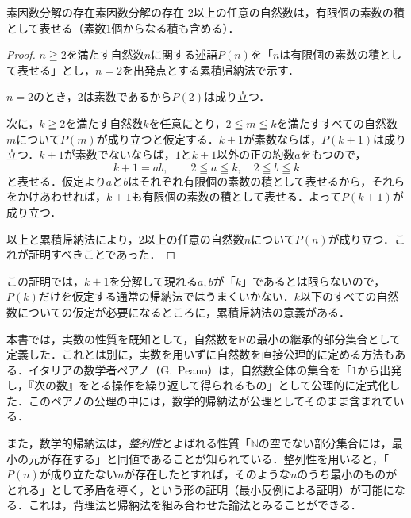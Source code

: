 \begin{prop}{素因数分解の存在}{素因数分解の存在}
  $2$以上の任意の自然数は，有限個の素数の積として表せる（素数$1$個からなる積も含める）．
\end{prop}

\begin{tleftbar}
  \begin{proof}
    $n \geqq 2$を満たす自然数$n$に関する述語$P(n)$を「$n$は有限個の素数の積として表せる」とし，$n = 2$を出発点とする累積帰納法で示す．

    $n = 2$のとき，$2$は素数であるから$P(2)$は成り立つ．

    次に，$k \geqq 2$を満たす自然数$k$を任意にとり，$2 \leqq m \leqq k$を満たすすべての自然数$m$について$P(m)$が成り立つと仮定する．$k + 1$が素数ならば，$P(k+1)$は成り立つ．$k + 1$が素数でないならば，$1$と$k + 1$以外の正の約数$a$をもつので，
    \[
      k + 1 = ab, \qquad 2 \leqq a \leqq k,\quad 2 \leqq b \leqq k
    \]
    と表せる．仮定より$a$と$b$はそれぞれ有限個の素数の積として表せるから，それらをかけあわせれば，$k + 1$も有限個の素数の積として表せる．よって$P(k+1)$が成り立つ．

    以上と累積帰納法により，$2$以上の任意の自然数$n$について$P(n)$が成り立つ．これが証明すべきことであった．
  \end{proof}
\end{tleftbar}

この証明では，$k + 1$を分解して現れる$a,b$が「$k$」であるとは限らないので，$P(k)$だけを仮定する通常の帰納法ではうまくいかない．$k$以下のすべての自然数についての仮定が必要になるところに，累積帰納法の意義がある．

\begin{mycolumn}
  本書では，実数の性質を既知として，自然数を$\mathbb{R}$の最小の継承的部分集合として定義した．これとは別に，実数を用いずに自然数を直接公理的に定める方法もある．イタリアの数学者ペアノ（G.~Peano）は，自然数全体の集合を「$1$から出発し，『次の数』をとる操作を繰り返して得られるもの」として公理的に定式化した．このペアノの公理の中には，数学的帰納法が公理としてそのまま含まれている．

  また，数学的帰納法は，\emph{整列性}とよばれる性質「$\mathbb{N}$の空でない部分集合には，最小の元が存在する」と同値であることが知られている．整列性を用いると，「$P(n)$が成り立たない$n$が存在したとすれば，そのような$n$のうち最小のものがとれる」として矛盾を導く，という形の証明（最小反例による証明）が可能になる．これは，背理法と帰納法を組み合わせた論法とみることができる．
\end{mycolumn}

